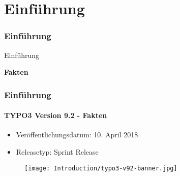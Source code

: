 %

\section{Einführung}
\begin{frame}[fragile]
	\frametitle{Einführung}

	\begin{center}\huge{Einführung}\end{center}
	\begin{center}\huge{\color{typo3darkgrey}\textbf{Fakten}}\end{center}

\end{frame}

\begin{frame}[fragile]
	\frametitle{Einführung}
	\framesubtitle{TYPO3 Version 9.2 - Fakten}

	\begin{itemize}
		\item Veröffentlichungsdatum: 10. April 2018
		\item Releasetyp: Sprint Release
	\end{itemize}

	\begin{figure}
		\texttt{[image: Introduction/typo3-v92-banner.jpg]}
	\end{figure}

\end{frame}

